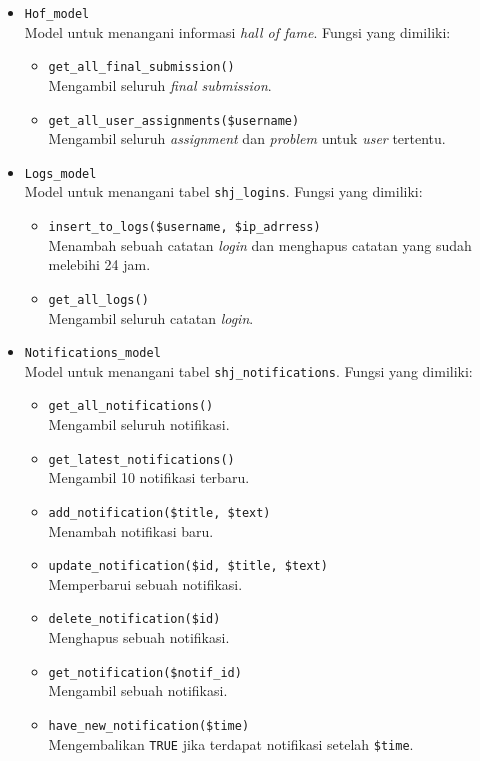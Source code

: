 \begin{itemize}
	\item \verb|Hof_model| \\ Model untuk menangani informasi \textit{hall of fame}. Fungsi yang dimiliki:
	\begin{itemize}
	    \item \verb|get_all_final_submission()| \\ Mengambil seluruh \textit{final submission}.
	    \item \verb|get_all_user_assignments($username)| \\ Mengambil seluruh \textit{assignment} dan \textit{problem} untuk \textit{user} tertentu.
	\end{itemize}
	
	\item \verb|Logs_model| \\ Model untuk menangani tabel \verb|shj_logins|. Fungsi yang dimiliki:
	\begin{itemize}
	    \item \verb|insert_to_logs($username, $ip_adrress)| \\ Menambah sebuah catatan \textit{login} dan menghapus catatan yang sudah melebihi 24 jam.
	    \item \verb|get_all_logs()| \\ Mengambil seluruh catatan \textit{login}.
	\end{itemize}
	
	\item \verb|Notifications_model| \\ Model untuk menangani tabel \verb|shj_notifications|. Fungsi yang dimiliki:
	\begin{itemize}
	    \item \verb|get_all_notifications()| \\ Mengambil seluruh notifikasi.
	    \item \verb|get_latest_notifications()| \\ Mengambil 10 notifikasi terbaru.
	    \item \verb|add_notification($title, $text)| \\ Menambah notifikasi baru.
	    \item \verb|update_notification($id, $title, $text)| \\ Memperbarui sebuah notifikasi. 
	    \item \verb|delete_notification($id)| \\ Menghapus sebuah notifikasi.
	    \item \verb|get_notification($notif_id)| \\ Mengambil sebuah notifikasi.
	    \item \verb|have_new_notification($time)| \\ Mengembalikan \verb|TRUE| jika terdapat notifikasi setelah \verb|$time|.
	\end{itemize}
	

\end{itemize}
